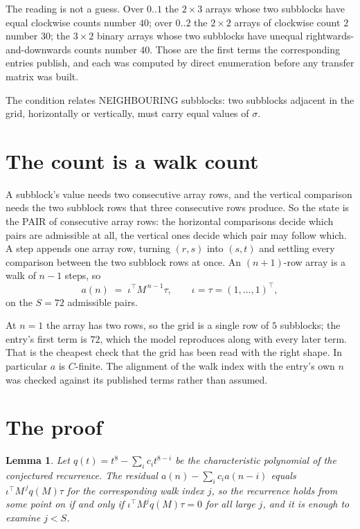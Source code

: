 \documentclass[11pt,a4paper]{article}
\theoremstyle{plain}
\newtheorem{lemma}[theorem]{Lemma}
\theoremstyle{definition}
\begin{document}
The reading is not a guess. Over $0..1$ the $2\times3$ arrays whose two subblocks have equal
clockwise counts number $40$; over $0..2$ the $2\times2$ arrays of clockwise count $2$ number
$30$; the $3\times2$ binary arrays whose two subblocks have unequal rightwards-and-downwards
counts number $40$. Those are the first terms the corresponding entries publish, and each was
computed by direct enumeration before any transfer matrix was built.

The condition relates NEIGHBOURING subblocks: two subblocks adjacent in the grid, horizontally
or vertically, must carry equal values of $\sigma$.

\section{The count is a walk count}

A subblock's value needs two consecutive array rows, and the vertical
comparison needs the two subblock rows that three consecutive rows produce. So the state is the
PAIR of consecutive array rows: the horizontal comparisons decide which pairs are admissible at
all, the vertical ones decide which pair may follow which. A step appends one array row,
turning $(r,s)$ into $(s,t)$ and settling every comparison between the two subblock rows at
once. An $(n+1)$-row array is a walk of $n-1$ steps, so
\[
a(n)\;=\;\iota^{\!\top}M^{\,n-1}\tau,\qquad\iota=\tau=(1,\dots,1)^{\!\top},
\]
on the $S=72$ admissible pairs.

At $n=1$ the array has two rows, so the grid is a single row of $5$
subblocks; the entry's first term is $72$, which the model
reproduces along with every later term. That is the cheapest check that the grid has been read
with the right shape.
In particular $a$ is $C$-finite. The alignment of the walk index with the entry's own $n$ was
checked against its published terms rather than assumed.

\section{The proof}

\begin{lemma}\label{lem:crit}
Let $q(t)=t^{8}-\sum_i c_it^{8-i}$ be the characteristic polynomial of the
conjectured recurrence. The residual $a(n)-\sum_ic_ia(n-i)$ equals
$\iota^{\!\top}M^{\,j}q(M)\tau$ for the corresponding walk index $j$, so the recurrence
holds from some point on if and only if $\iota^{\!\top}M^{j}q(M)\tau=0$ for all large $j$,
and it is enough to examine $j<S$.
\end{lemma}
\end{document}
